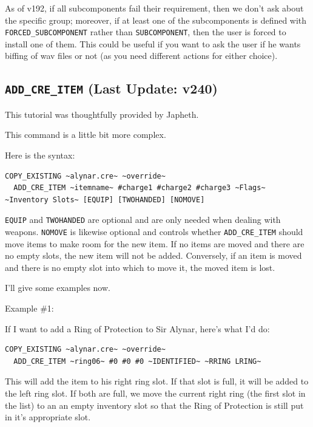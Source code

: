 \documentclass{article}
\def\t#1{{\tt #1}}
\begin{document}
As of v192, if all subcomponents fail their requirement, then we don't ask about
the specific group; moreover, if at least one of the subcomponents is defined with
\t{FORCED_SUBCOMPONENT} rather than \t{SUBCOMPONENT}, then the user is forced to
install one of them. This could be useful if you want to ask the user if he wants
biffing of wav files or not (as you need different actions for either choice).

\label{sec-add-cre-item}\subsection{\t{ADD_CRE_ITEM} (Last Update: v240)}
This tutorial was thoughtfully provided by Japheth.

This command is a little bit more complex.

Here is the syntax:

\begin{verbatim}
COPY_EXISTING ~alynar.cre~ ~override~
  ADD_CRE_ITEM ~itemname~ #charge1 #charge2 #charge3 ~Flags~ ~Inventory Slots~ [EQUIP] [TWOHANDED] [NOMOVE]
\end{verbatim}

\t{EQUIP} and \t{TWOHANDED} are optional and are only needed when
dealing with weapons. \t{NOMOVE} is likewise optional and controls
whether \t{ADD_CRE_ITEM} should move items to make room for the new
item. If no items are moved and there are no empty slots, the new item
will not be added. Conversely, if an item is moved and there is no
empty slot into which to move it, the moved item is lost.

I'll give some examples now.

Example \#1:

If I want to add a Ring of Protection to Sir Alynar, here's what I'd do:

\begin{verbatim}
COPY_EXISTING ~alynar.cre~ ~override~
  ADD_CRE_ITEM ~ring06~ #0 #0 #0 ~IDENTIFIED~ ~RRING LRING~
\end{verbatim}

This will add the item to his right ring slot. If that slot is full, it
will be added to the left ring slot. If both are full, we move the current
right ring (the first slot in the list) to an an empty inventory slot so
that the Ring of Protection is still put in it's appropriate slot.
\end{document}
